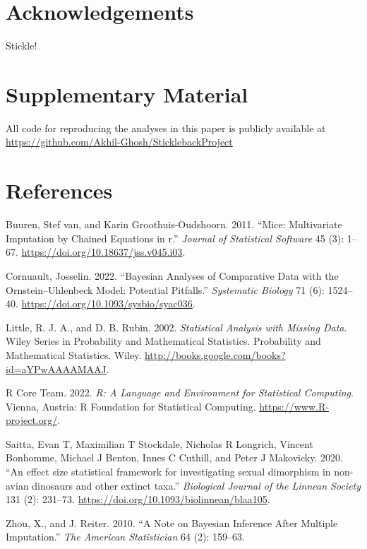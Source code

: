 \documentclass[
  12pt,
]{article}
\newlength{\cslhangindent}
\newlength{\cslentryspacingunit} %
\newenvironment{CSLReferences}[2] %
 {%
  \setlength{\parindent}{0pt}
  \ifodd #1
  \let\oldpar\par
  \def\par{\hangindent=\cslhangindent\oldpar}
  \fi
  \setlength{\parskip}{#2\cslentryspacingunit}
 }%
 {}
\begin{document}
\hypertarget{acknowledgements}{%
\section*{Acknowledgements}\label{acknowledgements}}

Stickle!

\hypertarget{supplementary-material}{%
\section*{Supplementary Material}\label{supplementary-material}}

All code for reproducing the analyses in this paper is publicly
available at \url{https://github.com/Akhil-Ghosh/SticklebackProject}

\hypertarget{references}{%
\section*{References}\label{references}}

\hypertarget{refs}{}
\begin{CSLReferences}{1}{0}
\leavevmode{}%
Buuren, Stef van, and Karin Groothuis-Oudshoorn. 2011. {``Mice:
Multivariate Imputation by Chained Equations in r.''} \emph{Journal of
Statistical Software} 45 (3): 1--67.
\url{https://doi.org/10.18637/jss.v045.i03}.

\leavevmode{}%
Cornuault, Josselin. 2022. {``{Bayesian Analyses of Comparative Data
with the Ornstein--Uhlenbeck Model: Potential Pitfalls}.''}
\emph{Systematic Biology} 71 (6): 1524--40.
\url{https://doi.org/10.1093/sysbio/syac036}.

\leavevmode{}%
Little, R. J. A., and D. B. Rubin. 2002. \emph{Statistical Analysis with
Missing Data}. Wiley Series in Probability and Mathematical Statistics.
Probability and Mathematical Statistics. Wiley.
\url{http://books.google.com/books?id=aYPwAAAAMAAJ}.

\leavevmode{}%
R Core Team. 2022. \emph{R: A Language and Environment for Statistical
Computing}. Vienna, Austria: R Foundation for Statistical Computing.
\url{https://www.R-project.org/}.

\leavevmode{}%
Saitta, Evan T, Maximilian T Stockdale, Nicholas R Longrich, Vincent
Bonhomme, Michael J Benton, Innes C Cuthill, and Peter J Makovicky.
2020. {``{An effect size statistical framework for investigating sexual
dimorphism in non-avian dinosaurs and other extinct taxa}.''}
\emph{Biological Journal of the Linnean Society} 131 (2): 231--73.
\url{https://doi.org/10.1093/biolinnean/blaa105}.

\leavevmode{}%
Zhou, X., and J. Reiter. 2010. {``A Note on Bayesian Inference After
Multiple Imputation.''} \emph{The American Statistician} 64 (2):
159--63.

\end{CSLReferences}
\end{document}
